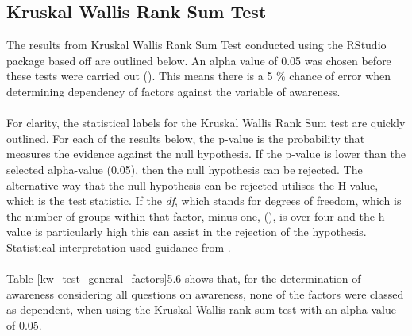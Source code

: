\subsection{Kruskal Wallis Rank Sum Test}
The results from Kruskal Wallis Rank Sum Test conducted using the RStudio package based off \cite{hollander_nonparametric_2014} are outlined below.  An alpha value of 0.05 was chosen before these tests were carried out (\cite{hollander_nonparametric_2014}). This means there is a 5 \% chance of error when determining dependency of factors against the variable of awareness.
\paragraph{}
For clarity, the statistical labels for the Kruskal Wallis Rank Sum test are quickly outlined. For each of the results below, the p-value is the probability that measures the evidence against the null hypothesis.  If the p-value is lower than the selected alpha-value (0.05), then the null hypothesis can be rejected. The alternative way that the null hypothesis can be rejected utilises the H-value, which is the test statistic. If the \textit{df}, which stands for degrees of freedom, which is the number of groups within that factor, minus one, (\cite{minitab_interpret_2022}), is over four and the h-value is particularly high this can assist in the rejection of the hypothesis. Statistical interpretation used guidance from \cite{minitab_interpret_2022}.
\paragraph{}

Table \ref{kw_test_general_factors}5.6 shows that, for the determination of awareness considering all questions on awareness, none of the factors were classed as dependent, when using the Kruskal Wallis rank sum test with an alpha value of 0.05. 

